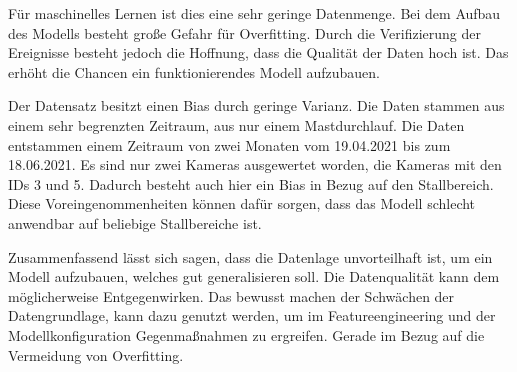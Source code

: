 Für maschinelles Lernen ist dies eine sehr geringe Datenmenge. Bei dem Aufbau des Modells besteht große Gefahr für Overfitting. Durch die Verifizierung der Ereignisse besteht jedoch die Hoffnung, dass die Qualität der Daten hoch ist. Das erhöht die Chancen ein funktionierendes Modell aufzubauen. \par

Der Datensatz besitzt einen Bias durch geringe Varianz. Die Daten stammen aus einem sehr begrenzten Zeitraum, aus nur einem Mastdurchlauf. Die Daten entstammen einem Zeitraum von zwei Monaten vom 19.04.2021 bis zum 18.06.2021. Es sind nur zwei Kameras ausgewertet worden, die Kameras mit den IDs 3 und 5. Dadurch besteht auch hier ein Bias in Bezug auf den Stallbereich. Diese Voreingenommenheiten können dafür sorgen, dass das Modell schlecht anwendbar auf beliebige Stallbereiche ist. \par

Zusammenfassend lässt sich sagen, dass die Datenlage unvorteilhaft ist, um ein Modell aufzubauen, welches gut generalisieren soll. Die Datenqualität kann dem möglicherweise Entgegenwirken. Das bewusst machen der Schwächen der Datengrundlage, kann dazu genutzt werden, um im Featureengineering und der Modellkonfiguration Gegenmaßnahmen zu ergreifen. Gerade im Bezug auf die Vermeidung von Overfitting.